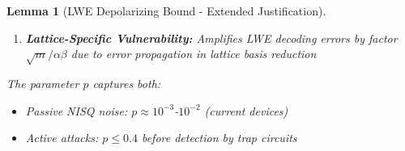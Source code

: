 \documentclass[preprint,12pt]{elsarticle}
\newtheorem{lemma}{Lemma}[section]
\begin{document}
\begin{lemma}[LWE Depolarizing Bound - Extended Justification]
\begin{enumerate}
                    \item \textbf{Lattice-Specific Vulnerability:} Amplifies LWE decoding errors by factor $\sqrt{m}/\alpha\beta$ due to error propagation in lattice basis reduction~\cite{lattice_fault_attacks}
                \end{enumerate}
                The parameter $p$ captures both:
                \begin{itemize}
                    \item \textit{Passive NISQ noise:} $p \approx 10^{-3}$-$10^{-2}$ (current devices)
                    \item \textit{Active attacks:} $p \leq 0.4$ before detection by trap circuits~\cite{fault_detection_bound}
                \end{itemize}
            \end{lemma}
\end{document}
